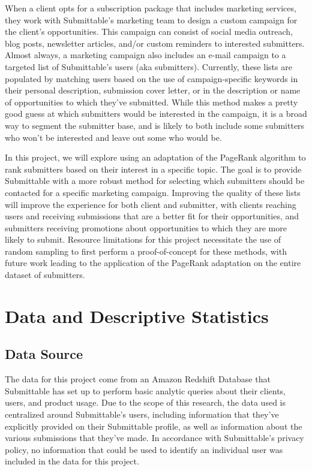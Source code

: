 \documentclass[12pt]{report}   %
\begin{document}
When a client opts for a subscription package that includes marketing services, they work with Submittable's marketing team to design a custom campaign for the client's opportunities. This campaign can consist of social media outreach, blog posts, newsletter articles, and/or custom reminders to interested submitters. Almost always, a marketing campaign also includes an e-mail campaign to a targeted list of Submittable's users (aka submitters). Currently, these lists are populated by matching users based on the use of campaign-specific keywords in their personal description, submission cover letter, or in the description or name of opportunities to which they've submitted. While this method makes a pretty good guess at which submitters would be interested in the campaign, it is a broad way to segment the submitter base, and is likely to both include some submitters who won't be interested and leave out some who would be. 

In this project, we will explore using an adaptation of the PageRank algorithm to rank submitters based on their interest in a specific topic. The goal is to provide Submittable with a more robust method for selecting which submitters should be contacted for a specific marketing campaign. Improving the quality of these lists will improve the experience for both client and submitter, with clients reaching users and receiving submissions that are a better fit for their opportunities, and submitters receiving promotions about opportunities to which they are more likely to submit. Resource limitations for this project necessitate the use of random sampling to first perform a proof-of-concept for these methods, with future work leading to the application of the PageRank adaptation on the entire dataset of submitters.

\chapter{Data and Descriptive Statistics}         
\section{Data Source}
The data for this project come from an Amazon Redshift Database that Submittable has set up to perform basic analytic queries about their clients, users, and product usage. Due to the scope of this research, the data used is centralized around Submittable's users, including information that they've explicitly provided on their Submittable profile, as well as information about the various submissions that they've made. In accordance with Submittable's privacy policy, no information that could be used to identify an individual user was included in the data for this project.
\end{document}
